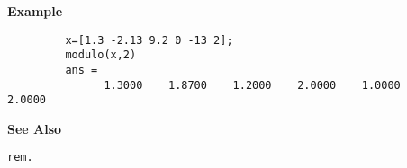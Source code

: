 {\bf \large \sf Example}
\begin{verbatim}
         x=[1.3 -2.13 9.2 0 -13 2];
         modulo(x,2)	
         ans = 
               1.3000    1.8700    1.2000    2.0000    1.0000    2.0000
\end{verbatim}
\vspace*{.5cm}


{\bf \large \sf See Also}\\
\hspace*{1.5cm}
\begin{minipage}[t]{13.5cm}
\begin{verbatim}
rem.
\end{verbatim}
\end{minipage}

